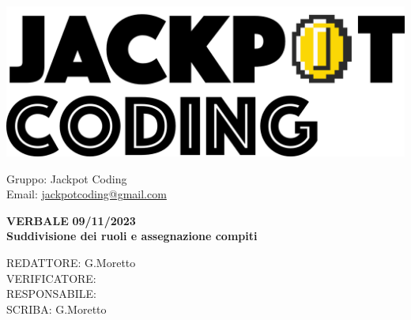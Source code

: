 \documentclass[5pt]{article}
\begin{document}
\begin{minipage}[t]{0.50\textwidth}
    \begin{flushleft}
        \hspace{10pt}
        \includegraphics[scale=0.65]{jackpot-logo.png} 
    \end{flushleft}
\end{minipage}
\hspace{-60pt} %
\begin{flushright}
    \begin{minipage}[t]{0.50\textwidth}
        \begin{flushright}
            Gruppo: {\Large Jackpot Coding}\\
            Email: \href{mailto:jackpotcoding@gmail.com}{jackpotcoding@gmail.com}
        \end{flushright}
    \end{minipage}
\end{flushright}

\vspace{24pt}

\begin{center}
    \textbf{\large VERBALE }
    \textbf{\large 09/11/2023} \\
    \textbf{\LARGE Suddivisione dei ruoli e assegnazione compiti}
\end{center}

\vspace{13pt}

\begin{flushleft}
    \begin{spacing}{1.5}
        REDATTORE:  G.Moretto \\%
        VERIFICATORE:   \\%
        RESPONSABILE:   \\%
        \vspace{7pt}
        SCRIBA: G.Moretto\\%
    \end{spacing}
\end{flushleft}
\end{document}
